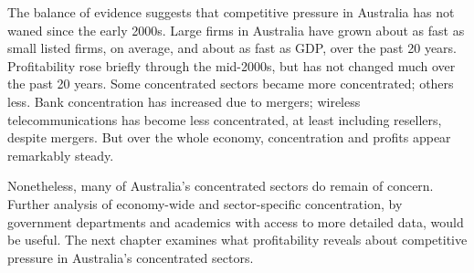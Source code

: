 The balance of evidence suggests that competitive pressure in Australia has not waned since the early 2000s. Large firms in Australia have grown about as fast as small listed firms, on average, and about as fast as GDP, over the past 20 years. Profitability rose briefly through the mid-2000s, but has not changed much over the past 20 years. Some concentrated sectors became more concentrated; others less. Bank concentration has increased due to mergers; wireless telecommunications has become less concentrated, at least including resellers, despite mergers. But over the whole economy, concentration and profits appear remarkably steady.

Nonetheless, many of Australia's concentrated sectors do remain of concern. Further analysis of economy-wide and sector-specific concentration, by government departments and academics with access to more detailed data, would be useful. The next chapter examines what profitability reveals about competitive pressure in Australia's concentrated sectors.



